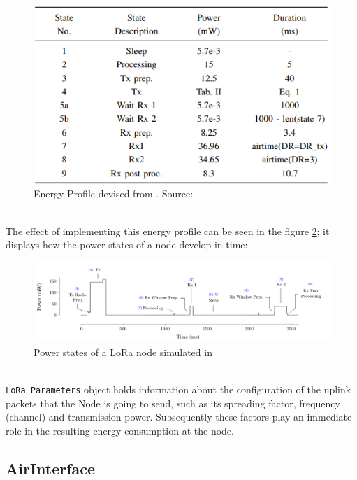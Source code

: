 \begin{figure}[H]
  \centering
  \includegraphics[scale=0.7]{figures/energy_profile.PNG}
  \caption{Energy Profile devised from \cite{energy_profile}. Source: \cite{simulator}}
  \label{fig:energy_profile}
\end{figure}\\

The effect of implementing this energy profile can be seen in the figure \ref{fig:power_states}; it displays how the power states of a node develop in time:

\begin{figure}[H]
  \centering
  \hspace*{-1cm}  
  \includegraphics[scale=0.5]{figures/class A 2.PNG}
  \caption{Power states of a LoRa node simulated in \cite{simulator}}
  \label{fig:power_states}
\end{figure}\\

\texttt{LoRa Parameters} object holds information about the configuration of the uplink packets that the Node is going to send, such as its spreading factor, frequency (channel) and transmission power. Subsequently these factors play an immediate role in the resulting energy consumption at the node.

\subsection{AirInterface}


